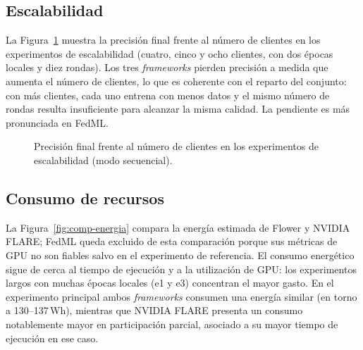 \subsection{Escalabilidad}\label{sec:comp-escalabilidad}

La Figura~\ref{fig:comp-escala} muestra la precisión final frente al número de clientes en los
experimentos de escalabilidad (cuatro, cinco y ocho clientes, con dos épocas locales y diez
rondas). Los tres \textit{frameworks} pierden precisión a medida que aumenta el número de
clientes, lo que es coherente con el reparto del conjunto: con más clientes, cada uno entrena con
menos datos y el mismo número de rondas resulta insuficiente para alcanzar la misma calidad. La
pendiente es más pronunciada en FedML.

\begin{figure}[htbp]
  \centering
  \caption{Precisión final frente al número de clientes en los experimentos de escalabilidad
  (modo secuencial).}
  \label{fig:comp-escala}
\end{figure}

\subsection{Consumo de recursos}\label{sec:comp-recursos}

La Figura~\ref{fig:comp-energia} compara la energía estimada de Flower y NVIDIA FLARE; FedML
queda excluido de esta comparación porque sus métricas de GPU no son fiables salvo en el
experimento de referencia. El consumo energético sigue de cerca al tiempo de ejecución y a la
utilización de GPU: los experimentos largos con muchas épocas locales (e1 y e3) concentran el
mayor gasto. En el experimento principal ambos \textit{frameworks} consumen una energía similar
(en torno a 130--137\,Wh), mientras que NVIDIA FLARE presenta un consumo notablemente mayor en
participación parcial, asociado a su mayor tiempo de ejecución en ese caso.

